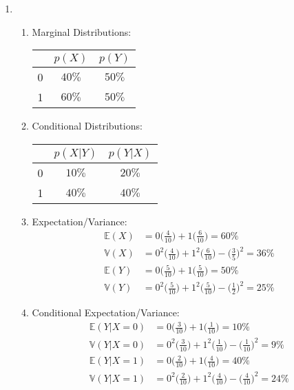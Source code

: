 \documentclass[11pt,a4paper]{article}
\begin{document}
\begin{enumerate}
			\begin{enumerate}
				\item
				\begin{enumerate}
					\item Marginal Distributions:
					\begin{table}[h]        
						\centering
						\begin{tabular}{c|cc}
							  & $p(X)$          & $p(Y)$          \\ \hline
							0 & $40\%$ & $50\%$ \\
							1 & $60\%$ & $50\%$ \\
						\end{tabular}
					\end{table}
					\item Conditional Distributions:
					\begin{table}[h]        
						\centering
						\begin{tabular}{c|cc}
							& $p(X|Y)$          & $p(Y|X)$          \\ \hline
							0 & $10\%$ & $20\%$ \\
							1 & $40\%$ & $40\%$ \\
					\end{tabular}
				\end{table}
					\item Expectation/Variance:
					\begin{align*}
					\mathbb{E}(X) &= 0\Big(\frac{4}{10}\Big) + 1\Big(\frac{6}{10}\Big) = 60\% \\
					\mathbb{V}(X) &= 0^2\Big(\frac{4}{10}\Big) + 1^2\Big(\frac{6}{10}\Big) - \Big(\frac{3}{5}\Big)^2 = 36\% \\
					\mathbb{E}(Y) &= 0\Big(\frac{5}{10}\Big) + 1\Big(\frac{5}{10}\Big) = 50\% \\
					\mathbb{V}(Y) &= 0^2\Big(\frac{5}{10}\Big) + 1^2\Big(\frac{5}{10}\Big) - \Big(\frac{1}{2}\Big)^2 = 25\%
					\end{align*}
					\item Conditional Expectation/Variance:
					\begin{align*}
					\mathbb{E}(Y|X=0) &= 0\Big(\frac{3}{10}\Big) + 1\Big(\frac{1}{10}\Big) = 10\% \\
					\mathbb{V}(Y|X=0) &= 0^2\Big(\frac{3}{10}\Big) + 1^2\Big(\frac{1}{10}\Big) - \Big(\frac{1}{10}\Big)^2 = 9\% \\
					\mathbb{E}(Y|X=1) &= 0\Big(\frac{2}{10}\Big) + 1\Big(\frac{4}{10}\Big) = 40\% \\
					\mathbb{V}(Y|X=1) &= 0^2\Big(\frac{2}{10}\Big) + 1^2\Big(\frac{4}{10}\Big) - \Big(\frac{4}{10}\Big)^2 = 24\%

\end{align*}
\end{enumerate}
\end{enumerate}
\end{enumerate}
\end{document}
